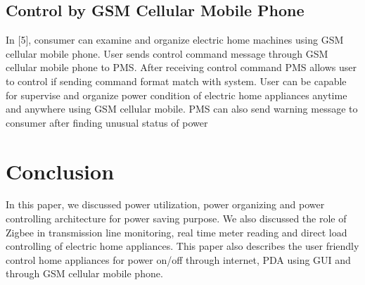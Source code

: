 \documentclass[10pt, conference, compsocconf]{IEEEtran}
\begin{document}
\subsection{Control by GSM Cellular Mobile Phone}
In [5], consumer can examine and organize electric home machines using GSM cellular mobile phone. User sends control command message through GSM cellular mobile phone to PMS. After receiving control command PMS allows user to control if sending command format match with system. User can be capable for supervise and organize power condition of electric home appliances anytime and anywhere using GSM cellular mobile. PMS can also send warning message to consumer after finding unusual status of power

\section{Conclusion}
In this paper, we discussed power utilization, power organizing and power controlling architecture for power saving purpose. We also discussed the role of Zigbee in transmission line monitoring, real time meter reading and direct load controlling of electric home appliances. This paper also describes the user friendly control home appliances for power on/off through internet, PDA using GUI and through GSM cellular mobile phone.
\end{document}
